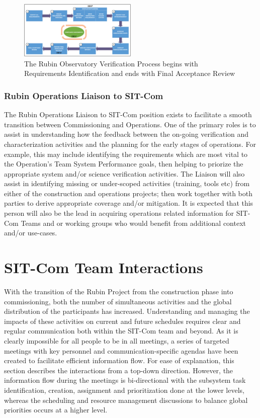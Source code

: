 \documentclass[SE,lsstdraft,authoryear,toc]{lsstdoc}
\begin{document}
\begin{figure}[h]
    \centering
    \includegraphics[width=0.5\textwidth]{static/verification_process}
    \caption{The Rubin Observatory Verification Process begins with Requirements Identification and ends with Final Acceptance Review}
    \label{fig:verification_process}
\end{figure}


\subsubsection{Rubin Operations Liaison to SIT-Com}
\label{sec:SCLT_liason_to_ops}

The Rubin Operations Liaison to SIT-Com position exists to facilitate a smooth transition between Commissioning and Operations.
One of the primary roles is to assist in understanding how the feedback between the on-going verification and characterization activities and the planning for the early stages of operations.
For example, this may include identifying the requirements which are most vital to the Operation's Team System Performance goals, then helping to priorize the appropriate system and/or science verification activities.
The Liaison will also assist in identifying missing or under-scoped activities (training, tools etc) from either of the construction and operations projects; then work together with both parties to derive appropriate coverage and/or mitigation.
It is expected that this person will also be the lead in acquiring operations related information for SIT-Com Teams and or working groups who would benefit from additional context and/or use-cases.

\section{SIT-Com Team Interactions}
\label{sec:interactions}
With the transition of the Rubin Project from the construction phase into commissioning, both the number of simultaneous activities and the global distribution of the participants has increased.
Understanding and managing the impacts of these activities on current and future schedules requires clear and regular communication both within the SIT-Com team and beyond.
As it is clearly impossible for all people to be in all meetings, a series of targeted meetings with key personnel and communication-specific agendas have been created to facilitate efficient information flow.
For ease of explanation, this section describes the interactions from a top-down direction.
However, the information flow during the meetings is bi-directional with the subsystem task identification, creation, assignment and prioritization done at the lower levels, whereas the scheduling and resource management discussions to balance global priorities occurs at a higher level.
\end{document}
